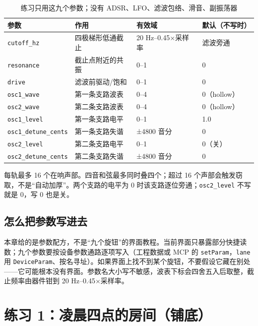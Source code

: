 \begin{table}[htbp]
\centering
\small
\begin{tabular}{@{}llll@{}}
\hline
参数 & 作用 & 有效域 & 默认（不写时） \\
\hline
\texttt{cutoff\_hz} & 四极梯形低通截止 & 20 Hz–0.45×采样率 & 滤波旁通 \\
\texttt{resonance} & 截止点附近的共振 & 0–1 & 0 \\
\texttt{drive} & 滤波前驱动/饱和 & 0–1 & 0 \\
\texttt{osc1\_wave} & 第一条支路波表 & 0–4 & 0（hollow） \\
\texttt{osc2\_wave} & 第二条支路波表 & 0–4 & 0（hollow） \\
\texttt{osc1\_level} & 第一条支路电平 & 0–1 & 1.0 \\
\texttt{osc1\_detune\_cents} & 第一条支路失谐 & ±4800 音分 & 0 \\
\texttt{osc2\_level} & 第二条支路电平 & 0–1 & 0（关） \\
\texttt{osc2\_detune\_cents} & 第二条支路失谐 & ±4800 音分 & 0 \\
\hline
\end{tabular}
\caption{练习只用这九个参数；没有 ADSR、LFO、滤波包络、滑音、副振荡器}
\label{tab:exercise-params}
\end{table}

每轨最多 16 个在响声部。四音和弦最多同时叠四个；超过 16 个声部会触发窃取，不是“自动加厚”。两个支路的电平为 0 时该支路逐位旁通；\texttt{osc2\_level} 不写就是 0，写 0 也是关。

\subsection{怎么把参数写进去}

本章给的是参数配方，不是“九个旋钮”的界面教程。当前界面只暴露部分快捷读数；九个参数要按设备参数通路逐项写入（工程数据或 MCP 的 \texttt{setParam}，\texttt{lane} 用 \texttt{DeviceParam}、按名寻址）。如果界面上找不到某个旋钮，不要假设它藏在别处——它可能根本没有界面。参数名大小写不敏感，波表下标会四舍五入后取整，截止频率由器件钳到 20 Hz–0.45×采样率。

\section{练习 1：凌晨四点的房间（铺底）}

